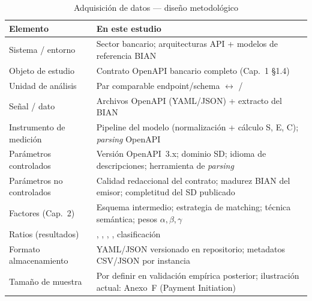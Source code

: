 \begin{table}[H]
  \centering
  \caption{Adquisición de datos --- diseño metodológico}
  \label{tab:adquisicion-datos}
  \small
  \begin{tabular}{@{}p{}p{}@{}}
    \toprule
    \textbf{Elemento} & \textbf{En este estudio} \\
    \midrule
    Sistema / entorno &
    Sector bancario; arquitecturas API + modelos de referencia BIAN \\
    Objeto de estudio &
    Contrato OpenAPI bancario completo (Cap.~1 §1.4) \\
    Unidad de análisis &
    Par comparable endpoint/\allowbreak schema $\leftrightarrow$ \Behavior{}/\BusinessObject{} \\
    Señal / dato &
    Archivos OpenAPI (YAML/JSON) + extracto del \ServiceDomain{} BIAN \\
    Instrumento de medición &
    Pipeline del modelo (normalización + cálculo S, E, C); \textit{parsing} OpenAPI \\
    Parámetros controlados &
    Versión OpenAPI~3.x; dominio SD; idioma de descripciones; herramienta de \textit{parsing} \\
    Parámetros no controlados &
    Calidad redaccional del contrato; madurez BIAN del emisor; completitud del SD publicado \\
    Factores (Cap.~2) &
    Esquema intermedio; estrategia de matching; técnica semántica; pesos $\alpha,\beta,\gamma$ \\
    Ratios (resultados) &
    \StructuralScore{}, \SemanticScore{}, \CoverageScore{}, \AlignmentScore{}, clasificación \\
    Formato almacenamiento &
    YAML/JSON versionado en repositorio; metadatos CSV/JSON por instancia \\
    Tamaño de muestra &
    Por definir en validación empírica posterior; ilustración actual: Anexo~F (Payment Initiation) \\
    \bottomrule
  \end{tabular}
\end{table}
